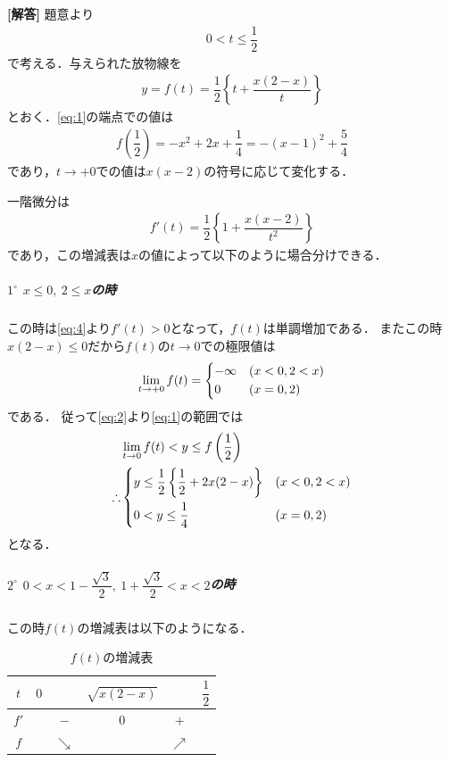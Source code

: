 \documentclass[../../main.tex]{subfiles}
\begin{document}
\begin{oframed}
  
\end{oframed}

{\bf [解答]}
題意より
\begin{align}
  0<t\le\dfrac{1}{2} \label{eq:1}
\end{align}
で考える．与えられた放物線を
\begin{align}
  y=f(t)=\dfrac{1}{2}\left\{t+\dfrac{x(2-x)}{t}\right\} \label{eq:2}
\end{align}
とおく．\cref{eq:1}の端点での値は
\begin{align}
  f\left(\dfrac{1}{2}\right)   = -x^2+2x+\dfrac{1}{4}=-(x-1)^2+\dfrac{5}{4} \label{eq:3}
\end{align}
であり，$t\to +0$での値は$x(x-2)$の符号に応じて変化する．

一階微分は
\begin{align}
  f'(t)=\dfrac{1}{2}\left\{1+\dfrac{x(x-2)}{t^2}\right\} \label{eq:4}
\end{align}
であり，この増減表は$x$の値によって以下のように場合分けできる．

\subparagraph{$1^\circ$ $x\le0,\ 2\le x$の時}

この時は\cref{eq:4}より$f'(t)>0$となって，$f(t)$は単調増加である．
またこの時$x(2-x) \le 0$だから$f(t)$の$t\to 0$での極限値は
\begin{align}
  \lim_{t\to +0}f(t) =
  \begin{dcases}
    -\infty & (x < 0, 2 < x) \\
    0 & (x=0,2)
  \end{dcases}
\end{align}
である．
従って\cref{eq:2}より\cref{eq:1}の範囲では
\begin{align}
  & \lim_{t\to0}f(t) < y \le f\left(\dfrac{1}{2}\right) \\
  \therefore
  &
  \begin{dcases}
    y \le \dfrac{1}{2}\left\{\dfrac{1}{2}+2x(2-x)\right\} & (x<0,2<x) \\
    0 < y \le \dfrac{1}{4} & (x=0,2)
  \end{dcases}\label{eq:5}
\end{align}
となる．

\subparagraph{$2^\circ$ $0<x<1-\dfrac{\sqrt{3}}{2},\ 1+\dfrac{\sqrt{3}}{2}<x<2$の時}

この時$f(t)$の増減表は以下のようになる．
\begin{table}[htb]
  \begin{center}
    \caption{$f(t)$の増減表}
    \begin{tabular}{c|ccccc}
      $t$ & $0$ & & $\sqrt{x(2-x)}$ & & $\dfrac{1}{2}$ \\
      \hline
      $f'$ & & $-$ & $0$ & $+$ & \\
      \hline
      $f$ & & $\searrow$ & & $\nearrow$ &
    \end{tabular}
  \end{center}
\end{table}
\end{document}

